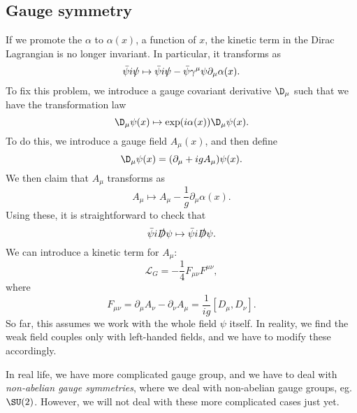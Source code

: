 \documentclass[a4paper]{article}
\begin{document}
\subsection{Gauge symmetry}
If we promote the $\alpha$ to $\alpha(x)$, a function of $x$, the kinetic term in the Dirac Lagrangian is no longer invariant. In particular, it transforms as
\[
  \bar\psi i \slashed{\psi} \mapsto \bar\psi i \slashed \psi - \bar\psi \gamma^\mu \psi \partial_\mu \alpha (x).
\]
To fix this problem, we introduce a gauge covariant derivative $\D_\mu$ such that we have the transformation law
\[
  \D_\mu \psi(x) \mapsto \exp(i\alpha (x)) \D_\mu \psi(x).
\]
To do this, we introduce a gauge field $A_\mu(x)$, and then define
\[
  \D_\mu \psi(x) = (\partial_\mu + i g A_\mu) \psi(x).
\]
We then claim that $A_\mu$ transforms as
\[
  A_\mu \mapsto A_\mu - \frac{1}{g} \partial_\mu \alpha(x).
\]
Using these, it is straightforward to check that
\[
  \bar\psi i \slashed D \psi \mapsto \bar\psi i \slashed D \psi.
\]
We can introduce a kinetic term for $A_\mu$:
\[
  \mathcal{L}_G = -\frac{1}{4} F_{\mu\nu} F^{\mu\nu},
\]
where
\[
  F_{\mu\nu} = \partial_\mu A_\nu - \partial_\nu A_\mu = \frac{1}{ig} [D_\mu, D_\nu].
\]
So far, this assumes we work with the whole field $\psi$ itself. In reality, we find the weak field couples only with left-handed fields, and we have to modify these accordingly.

In real life, we have more complicated gauge group, and we have to deal with \emph{non-abelian gauge symmetries}, where we deal with non-abelian gauge groups, eg. $\SU(2)$. However, we will not deal with these more complicated cases just yet.
\end{document}
